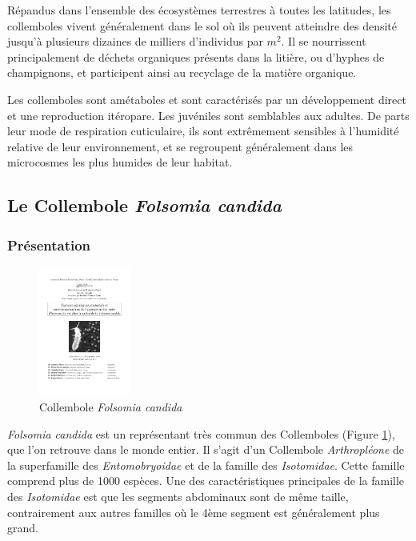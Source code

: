 Répandus dans l'ensemble des écosystèmes terrestres à toutes les latitudes, les
collemboles vivent généralement dans le sol où ils
peuvent atteindre des densité jusqu'à plusieurs dizaines de milliers d'individus
par $m^2$. Il se nourrissent principalement de déchets organiques présents dans
la litière, ou d'hyphes de champignons, et participent ainsi au recyclage de la
matière organique.

Les collemboles sont amétaboles et sont caractérisés par un développement direct
et une reproduction itéropare. Les juvéniles sont semblables aux adultes. De
parts leur mode de respiration cuticulaire, ils sont extrêmement sensibles à
l'humidité relative de leur environnement, et se regroupent généralement dans
les microcosmes les plus humides de leur habitat. 

\subsection{Le Collembole \textit{Folsomia candida}}

\subsubsection{Présentation}

\begin{figure}[!ht]
\begin{center}
\includegraphics[width=3cm,angle=90]{1_CorpsDeThese/Methodo/folsomiacandida.pdf}
\caption[ Collembole
\textit{Folsomia candida}]{Collembole
\textit{Folsomia candida}}
\label{fig:folsomia}
\end{center}
\end{figure}


\textit{Folsomia candida} est un représentant très commun des Collemboles
(Figure \ref{fig:folsomia}), que l'on retrouve dans le monde entier. Il s'agit d'un
Collembole \textit{Arthropléone} de la superfamille des \textit{Entomobryoidae} et de la
famille des \textit{Isotomidae}. Cette famille comprend plus de 1000 espèces.
Une des caractéristiques principales de la famille des \textit{Isotomidae} est
que les segments abdominaux sont de même taille, contrairement aux autres
familles où le 4ème segment est généralement plus grand. 

